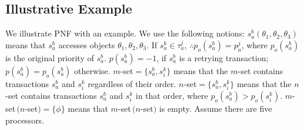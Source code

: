 \subsection{Illustrative Example}
We illustrate PNF with an example. We use the following notions: $s_{a}^{b}(\theta_{1},\theta_{2},\theta_{3})$ means that $s_{a}^{b}$ accesses objects $\theta_{1},\theta_{2},\theta_{3}$. If $s_{a}^{b}\in\tau_{a}^{j},\,\therefore p_{o}(s_{a}^{b})=p_{a}^{j}$,
where $p_{o}(s_{a}^{b})$ is the original priority of $s_{a}^{b}$.
$p(s_{a}^{b})=-1$, if $s_{a}^{b}$ is a retrying transaction; $p(s_{a}^{b})=p_{o}(s_{a}^{b})$ otherwise. $m$-set$=\{s_{a}^{b},s_{i}^{k}\}$ means that the $m$-set contains
transactions $s_{a}^{b}$ and $s_{i}^{k}$ regardless of their order.
$n$-set$=\{s_{a}^{b},s_{i}^{k}\}$ means that the $n$-set contains transactions
$s_{a}^{b}$ and $s_{i}^{k}$ in that order, where $p_{o}(s_{a}^{b})>p_{o}(s_{i}^{k})$.
$m$-set$\,(n$-set$)=\{\phi\}$ means that $m$-set$\,(n$-set$)$ is empty.
%
Assume there are five processors.
